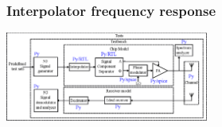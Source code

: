 \documentclass{sdkslides}
\begin{document}
\begin{frame}[t]
    \frametitle{Interpolator frequency response}
    \begin{center}
        \includegraphics[width=0.5\textwidth]{Pics/outphasing_model.eps}
    \end{center}
    \begin{figure}
        \begin{center}
            \qquad
        \end{center}
    \end{figure}

\end{frame}
\end{document}
